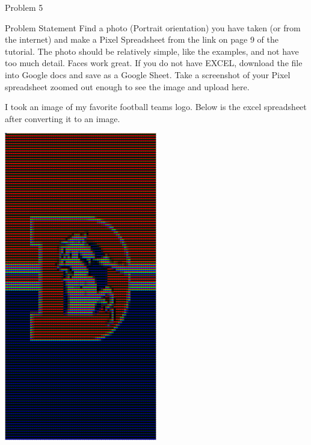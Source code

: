 \begin{problem}{Problem 5}
    \begin{statement}{Problem Statement}
        Find a photo (Portrait orientation) you have taken (or from the internet) and make a Pixel Spreadsheet from the link on page 9 of the tutorial. The photo should be relatively simple, like the 
        examples, and not have too much detail. Faces work great. If you do not have EXCEL, download the file into Google docs and save as a Google Sheet. Take a screenshot of your Pixel spreadsheet 
        zoomed out enough to see the image and upload here.
    \end{statement}

    \begin{Highlight}[Solution]
        I took an image of my favorite football teams logo. Below is the excel spreadsheet after converting it to an image.

        \begin{center}
            \includegraphics[width=0.5\textwidth]{Images/Broncos.png}
        \end{center}
    \end{Highlight}
\end{problem}

